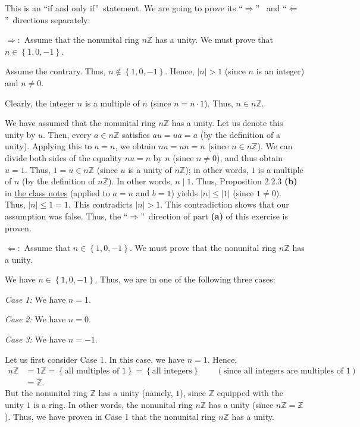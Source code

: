 \documentclass[paper=a4, fontsize=12pt]{scrartcl}%
\theoremstyle{plainsl}
\theoremstyle{definition}
\theoremstyle{remark}
\begin{document}
This is an \textquotedblleft if and only if\textquotedblright\ statement. We
are going to prove its \textquotedblleft$\Longrightarrow$\textquotedblright%
\ and \textquotedblleft$\Longleftarrow$\textquotedblright\ directions separately:

$\Longrightarrow:$ Assume that the nonunital ring $n\mathbb{Z}$ has a unity.
We must prove that $n\in\left\{  1,0,-1\right\}  $.

Assume the contrary. Thus, $n\notin\left\{  1,0,-1\right\}  $. Hence,
$\left\vert n\right\vert >1$ (since $n$ is an integer) and $n\neq0$.

Clearly, the integer $n$ is a multiple of $n$ (since $n=n\cdot1$). Thus, $n\in
n\mathbb{Z}$.

We have assumed that the nonunital ring $n\mathbb{Z}$ has a unity. Let us
denote this unity by $u$. Then, every $a\in n\mathbb{Z}$ satisfies $au=ua=a$
(by the definition of a unity). Applying this to $a=n$, we obtain $nu=un=n$
(since $n\in n\mathbb{Z}$). We can divide both sides of the equality $nu=n$ by
$n$ (since $n\neq0$), and thus obtain $u=1$. Thus, $1=u\in n\mathbb{Z}$ (since
$u$ is a unity of $n\mathbb{Z}$); in other words, $1$ is a multiple of $n$ (by
the definition of $n\mathbb{Z}$). In other words, $n\mid1$. Thus, Proposition
2.2.3 \textbf{(b)} in
\href{http://www.cip.ifi.lmu.de/~grinberg/t/19s/notes.pdf}{the class notes}
(applied to $a=n$ and $b=1$) yields $\left\vert n\right\vert \leq\left\vert
1\right\vert $ (since $1\neq0$). Thus, $\left\vert n\right\vert \leq1=1$. This
contradicts $\left\vert n\right\vert >1$. This contradiction shows that our
assumption was false. Thus, the \textquotedblleft$\Longrightarrow
$\textquotedblright\ direction of part \textbf{(a)} of this exercise is proven.

$\Longleftarrow:$ Assume that $n\in\left\{  1,0,-1\right\}  $. We must prove
that the nonunital ring $n\mathbb{Z}$ has a unity.

We have $n\in\left\{  1,0,-1\right\}  $. Thus, we are in one of the following
three cases:

\textit{Case 1:} We have $n=1$.

\textit{Case 2:} We have $n=0$.

\textit{Case 3:} We have $n=-1$.

Let us first consider Case 1. In this case, we have $n=1$. Hence,%
\begin{align*}
n\mathbb{Z}  &  =1\mathbb{Z}=\left\{  \text{all multiples of }1\right\}
=\left\{  \text{all integers}\right\}  \qquad\left(  \text{since all integers
are multiples of }1\right) \\
&  =\mathbb{Z}.
\end{align*}
But the nonunital ring $\mathbb{Z}$ has a unity (namely, $1$), since
$\mathbb{Z}$ equipped with the unity $1$ is a ring. In other words, the
nonunital ring $n\mathbb{Z}$ has a unity (since $n\mathbb{Z}=\mathbb{Z}$).
Thus, we have proven in Case 1 that the nonunital ring $n\mathbb{Z}$ has a unity.
\end{document}
